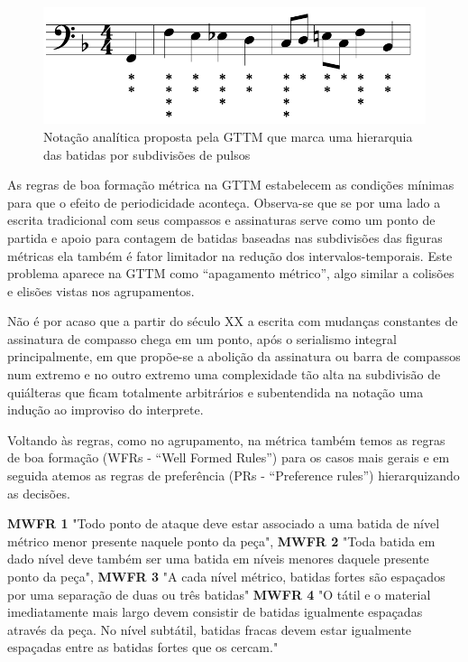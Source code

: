 \documentclass[
	12pt,				%
	openright,			%
	twoside,			%
	a4paper,			%
	english,			%
	french,				%
	spanish,			%
	brazil				%
	]{abntex2}
\begin{document}
\begin{figure}[htb]
	\caption{\label{fig_grafico}Notação analítica proposta pela GTTM que marca uma hierarquia das batidas por subdivisões de pulsos}
	\begin{center}
	    \includegraphics[scale=0.45]{gttm/GTTM-m21-metes.png}
	\end{center}
\end{figure}


As regras de boa formação métrica na GTTM estabelecem as condições mínimas para que o efeito de periodicidade aconteça.  Observa-se que se por uma lado a escrita tradicional com seus compassos e assinaturas serve como um ponto de partida e apoio para contagem de batidas baseadas nas subdivisões das figuras métricas ela também é fator limitador na redução dos intervalos-temporais. Este problema aparece na GTTM como “apagamento métrico”\cite[pg.101]{lerdahl1983generative}, algo similar a colisões e elisões vistas nos agrupamentos. 

Não é por acaso que a partir do século XX a escrita com mudanças constantes de assinatura de compasso chega em um ponto, após o serialismo integral principalmente, em que propõe-se a abolição da assinatura ou barra de compassos num extremo e no outro extremo uma complexidade tão alta na subdivisão de quiálteras que ficam totalmente arbitrários e subentendida na notação uma indução ao improviso do interprete.

Voltando às regras, como no agrupamento, na métrica também temos as regras de boa formação (WFRs - “Well Formed Rules”) para os casos mais gerais e em seguida atemos as regras de preferência (PRs - “Preference rules”) hierarquizando as decisões.

\begin{citacao}
\textbf{MWFR 1 }"Todo ponto de ataque deve estar associado a uma batida de nível métrico menor presente naquele ponto da peça",  
\textbf{MWFR 2} "Toda batida em dado nível deve também ser uma batida em níveis menores daquele presente ponto da peça", 
\textbf{MWFR 3} "A cada nível métrico, batidas fortes são espaçados por uma separação de duas ou três batidas" 
\textbf{MWFR 4} "O tátil e o material imediatamente mais largo devem consistir de batidas igualmente espaçadas através da peça. No nível subtátil, batidas fracas devem estar igualmente espaçadas entre as batidas fortes que os cercam." 
 \cite{lerdahl1983generative}
\end{citacao} 
\end{document}
